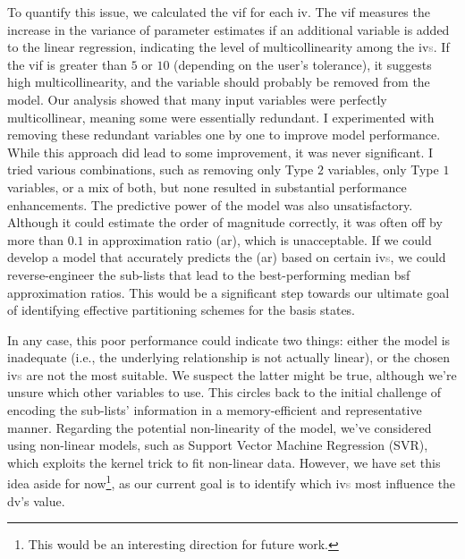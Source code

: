 To quantify this issue, we calculated the \acrshort{vif} for each \acrshort{iv}. The \acrshort{vif} measures the increase in the variance of parameter estimates if an additional variable is added to the linear regression, indicating the level of multicollinearity among the \acrshort{iv}\textcolor{gray}{s}. If the \acrshort{vif} is greater than $5$ or $10$ (depending on the user's tolerance), it suggests high multicollinearity, and the variable should probably be removed from the model. Our analysis showed that many input variables were perfectly multicollinear, meaning some were essentially redundant. I experimented with removing these redundant variables one by one to improve model performance. While this approach did lead to some improvement, it was never significant. I tried various combinations, such as removing only Type $2$ variables, only Type $1$ variables, or a mix of both, but none resulted in substantial performance enhancements. The predictive power of the model was also unsatisfactory. Although it could estimate the order of magnitude correctly, it was often off by more than $0.1$ in approximation ratio (\acrshort{ar}), which is unacceptable. If we could develop a model that accurately predicts the (\acrshort{ar}) based on certain \acrshort{iv}\textcolor{gray}{s}, we could reverse-engineer the sub-lists that lead to the best-performing median \acrshort{bsf} approximation ratios. This would be a significant step towards our ultimate goal of identifying effective partitioning schemes for the basis states.

In any case, this poor performance could indicate two things: either the model is inadequate (i.e., the underlying relationship is not actually linear), or the chosen \acrshort{iv}\textcolor{gray}{s} are not the most suitable. We suspect the latter might be true, although we're unsure which other variables to use. This circles back to the initial challenge of encoding the sub-lists' information in a memory-efficient and representative manner. Regarding the potential non-linearity of the model, we've considered using non-linear models, such as Support Vector Machine Regression (SVR), which exploits the kernel trick to fit non-linear data. However, we have set this idea aside for now\footnote{This would be an interesting direction for future work.}, as our current goal is to identify which \acrshort{iv}\textcolor{gray}{s} most influence the \acrshort{dv}'s value.

